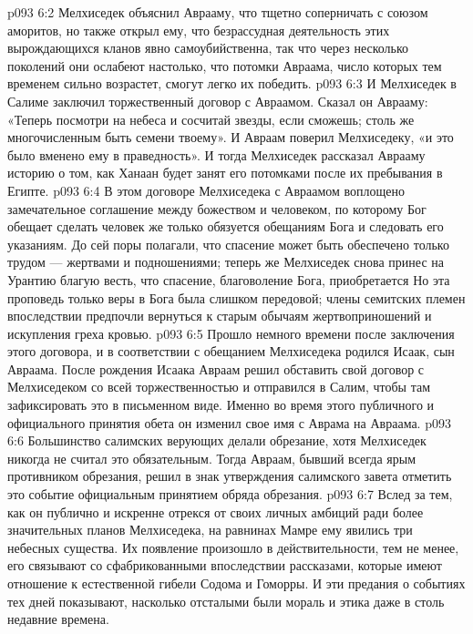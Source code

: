 \vs p093 6:2 Мелхиседек объяснил Аврааму, что тщетно соперничать с союзом аморитов, но также открыл ему, что безрассудная деятельность этих вырождающихся кланов явно самоубийственна, так что через несколько поколений они ослабеют настолько, что потомки Авраама, число которых тем временем сильно возрастет, смогут легко их победить.
\vs p093 6:3 И Мелхиседек в Салиме заключил торжественный договор с Авраамом. Сказал он Аврааму: «Теперь посмотри на небеса и сосчитай звезды, если сможешь; столь же многочисленным быть семени твоему». И Авраам поверил Мелхиседеку, «и это было вменено ему в праведность». И тогда Мелхиседек рассказал Аврааму историю о том, как Ханаан будет занят его потомками после их пребывания в Египте.
\vs p093 6:4 \pc В этом договоре Мелхиседека с Авраамом воплощено замечательное соглашение между божеством и человеком, по которому Бог обещает сделать  человек же только обязуется  обещаниям Бога и следовать его указаниям. До сей поры полагали, что спасение может быть обеспечено только трудом --- жертвами и подношениями; теперь же Мелхиседек снова принес на Урантию благую весть, что спасение, благоволение Бога, приобретается  Но эта проповедь только веры в Бога была слишком передовой; члены семитских племен впоследствии предпочли вернуться к старым обычаям жертвоприношений и искупления греха кровью.
\vs p093 6:5 Прошло немного времени после заключения этого договора, и в соответствии с обещанием Мелхиседека родился Исаак, сын Авраама. После рождения Исаака Авраам решил обставить свой договор с Мелхиседеком со всей торжественностью и отправился в Салим, чтобы там зафиксировать это в письменном виде. Именно во время этого публичного и официального принятия обета он изменил свое имя с Аврама на Авраама.
\vs p093 6:6 Большинство салимских верующих делали обрезание, хотя Мелхиседек никогда не считал это обязательным. Тогда Авраам, бывший всегда ярым противником обрезания, решил в знак утверждения салимского завета отметить это событие официальным принятием обряда обрезания.
\vs p093 6:7 Вслед за тем, как он публично и искренне отрекся от своих личных амбиций ради более значительных планов Мелхиседека, на равнинах Мамре ему явились три небесных существа. Их появление произошло в действительности, тем не менее, его связывают со сфабрикованными впоследствии рассказами, которые имеют отношение к естественной гибели Содома и Гоморры. И эти предания о событиях тех дней показывают, насколько отсталыми были мораль и этика даже в столь недавние времена.
